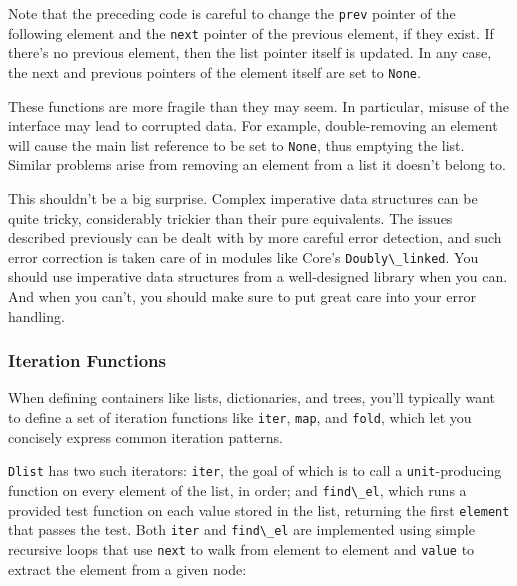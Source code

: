 Note that the preceding code is careful to change the
\passthrough{\lstinline!prev!} pointer of the following element and the
\passthrough{\lstinline!next!} pointer of the previous element, if they
exist. If there's no previous element, then the list pointer itself is
updated. In any case, the next and previous pointers of the element
itself are set to \passthrough{\lstinline!None!}.

These functions are more fragile than they may seem. In particular,
misuse of the interface may lead to corrupted data. For example,
double-removing an element will cause the main list reference to be set
to \passthrough{\lstinline!None!}, thus emptying the list. Similar
problems arise from removing an element from a list it doesn't belong
to.

This shouldn't be a big surprise. Complex imperative data structures can
be quite tricky, considerably trickier than their pure equivalents. The
issues described previously can be dealt with by more careful error
detection, and such error correction is taken care of in modules like
Core's \passthrough{\lstinline!Doubly\_linked!}. You should use
imperative data structures from a well-designed library when you can.
And when you can't, you should make sure to put great care into your
error handling. 

\hypertarget{iteration-functions}{%
\subsubsection{Iteration Functions}\label{iteration-functions}}

When defining containers like lists, dictionaries, and trees, you'll
typically want to define a set of iteration functions like
\passthrough{\lstinline!iter!}, \passthrough{\lstinline!map!}, and
\passthrough{\lstinline!fold!}, which let you concisely express common
iteration patterns.

\passthrough{\lstinline!Dlist!} has two such iterators:
\passthrough{\lstinline!iter!}, the goal of which is to call a
\passthrough{\lstinline!unit!}-producing function on every element of
the list, in order; and \passthrough{\lstinline!find\_el!}, which runs a
provided test function on each value stored in the list, returning the
first \passthrough{\lstinline!element!} that passes the test. Both
\passthrough{\lstinline!iter!} and \passthrough{\lstinline!find\_el!}
are implemented using simple recursive loops that use
\passthrough{\lstinline!next!} to walk from element to element and
\passthrough{\lstinline!value!} to extract the element from a given
node:


